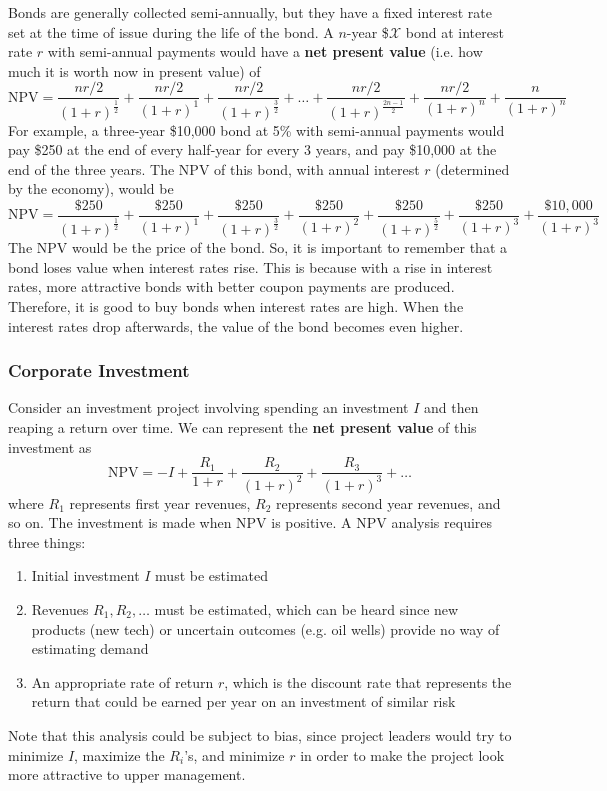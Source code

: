 \documentclass{article}
\begin{document}
    \begin{definition}
      Bonds are generally collected semi-annually, but they have a fixed interest rate set at the time of issue during the life of the bond. A $n$-year \$$\mathcal{X}$ bond at interest rate $r$ with semi-annual payments would have a \textbf{net present value} (i.e. how much it is worth now in present value) of 
      \[\text{NPV} = \frac{nr/2}{(1+r)^{\frac{1}{2}}} + \frac{nr/2}{(1+r)^{1}} + \frac{nr/2}{(1+r)^{\frac{3}{2}}} + \ldots + \frac{nr/2}{(1+r)^{\frac{2n-1}{2}}} + \frac{nr/2}{(1+r)^{n}} + \frac{n}{(1+r)^{n}}\]
      For example, a three-year \$10,000 bond at 5\% with semi-annual payments would pay \$250 at the end of every half-year for every 3 years, and pay \$10,000 at the end of the three years. The NPV of this bond, with annual interest $r$ (determined by the economy), would be
      \[\text{NPV} = \frac{\$250}{(1+r)^{\frac{1}{2}}} + \frac{\$250}{(1+r)^{1}} + \frac{\$250}{(1+r)^{\frac{3}{2}}} + \frac{\$250}{(1+r)^{2}} + \frac{\$250}{(1+r)^{\frac{5}{2}}} + 
      \frac{\$250}{(1+r)^{3}} + \frac{\$10,000}{(1+r)^{3}}\]
      The NPV would be the price of the bond. So, it is important to remember that a bond loses value when interest rates rise. This is because with a rise in interest rates, more attractive bonds with better coupon payments are produced. Therefore, it is good to buy bonds when interest rates are high. When the interest rates drop afterwards, the value of the bond becomes even higher. 
    \end{definition}

    \subsubsection{Corporate Investment}

      \begin{definition}
        Consider an investment project involving spending an investment $I$ and then reaping a return over time. We can represent the \textbf{net present value} of this investment as 
        \[\text{NPV} = -I + \frac{R_1}{1+r} + \frac{R_2}{(1+r)^2} + \frac{R_3}{(1+r)^3} + \ldots\]
        where $R_1$ represents first year revenues, $R_2$ represents second year revenues, and so on. The investment is made when NPV is positive. A NPV analysis requires three things:
        \begin{enumerate}
          \item Initial investment $I$ must be estimated
          \item Revenues $R_1, R_2, \ldots$ must be estimated, which can be heard since new products (new tech) or uncertain outcomes (e.g. oil wells) provide no way of estimating demand
          \item An appropriate rate of return $r$, which is the discount rate that represents the return that could be earned per year on an investment of similar risk
        \end{enumerate}
        Note that this analysis could be subject to bias, since project leaders would try to minimize $I$, maximize the $R_i$'s, and minimize $r$ in order to make the project look more attractive to upper management. 
      \end{definition}
\end{document}
